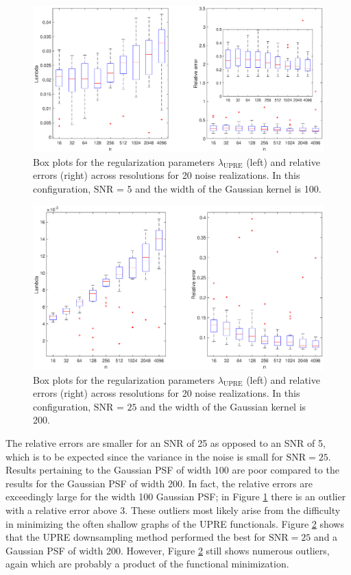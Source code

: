 \documentclass[12pt]{article}
\newcommand{\regparam}{\lambda}
\begin{document}
\begin{figure}
	\centerline{\includegraphics[scale = 0.4]{Figures/BothBoxes1D_F2_S05_W100_R20.eps}}
\caption{Box plots for the regularization parameters $\regparam_{\text{UPRE}}$ (left) and relative errors (right) across resolutions for 20 noise realizations. In this configuration, $\text{SNR = 5}$ and the width of the Gaussian kernel is 100.}
\label{BothBoxes1D_F2_S05_W100_R20}
\end{figure}

\begin{figure}
	\centerline{\includegraphics[scale = 0.4]{Figures/BothBoxes1D_F2_S25_W200_R20.eps}}
\caption{Box plots for the regularization parameters $\regparam_{\text{UPRE}}$  (left) and relative errors (right) across resolutions for 20 noise realizations. In this configuration, $\text{SNR = 25}$ and the width of the Gaussian kernel is 200.}
\label{BothBoxes1D_F2_S25_W200_R20}
\end{figure}

The relative errors are smaller for an SNR of 25 as opposed to an SNR of 5, which is to be expected since the variance in the noise is small for $\text{SNR} = 25$. Results pertaining to the Gaussian PSF of width 100 are poor compared to the results for the Gaussian PSF of width 200. In fact, the relative errors are exceedingly large for the width 100 Gaussian PSF; in Figure \ref{BothBoxes1D_F2_S05_W100_R20} there is an outlier with a relative error above 3. These outliers most likely arise from the difficulty in minimizing the often shallow graphs of the UPRE functionals. Figure \ref{BothBoxes1D_F2_S25_W200_R20} shows that the UPRE downsampling method performed the best for $\text{SNR} = 25$ and a Gaussian PSF of width 200. However, Figure \ref{BothBoxes1D_F2_S25_W200_R20} still shows numerous outliers, again which are probably a product of the functional minimization. 
\end{document}
